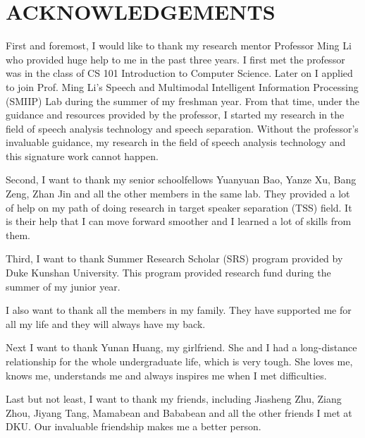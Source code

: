 

\section{ACKNOWLEDGEMENTS}\label{sec:acknowledgements}
First and foremost, I would like to thank my research mentor Professor Ming Li who provided huge help to me in the past three years.
I first met the professor was in the class of CS 101 Introduction to Computer Science.
Later on I applied to join Prof. Ming Li's Speech and Multimodal Intelligent Information Processing (SMIIP) Lab during the summer of my freshman year.
From that time, under the guidance and resources provided by the professor, I started my research in the field of speech analysis technology and speech separation.
Without the professor's invaluable guidance, my research in the field of speech analysis technology and this signature work cannot happen.

Second, I want to thank my senior schoolfellows Yuanyuan Bao, Yanze Xu, Bang Zeng, Zhan Jin and all the other members in the same lab.
They provided a lot of help on my path of doing research in target speaker separation (TSS) field.
It is their help that I can move forward smoother and I learned a lot of skills from them.

Third, I want to thank Summer Research Scholar (SRS) program provided by Duke Kunshan University.
This program provided research fund during the summer of my junior year.

I also want to thank all the members in my family. They have supported me for all my life and they will always have my back.

Next I want to thank Yunan Huang, my girlfriend. She and I had a long-distance relationship for the whole undergraduate life, which is very tough.
She loves me, knows me, understands me and always inspires me when I met difficulties.

Last but not least, I want to thank my friends, including Jiasheng Zhu, Ziang Zhou, Jiyang Tang, Mamabean and Bababean and all the other friends I met at DKU.
Our invaluable friendship makes me a better person.
